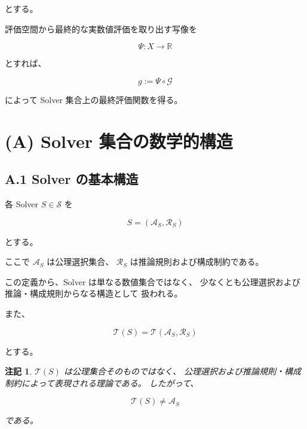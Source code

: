 \documentclass[a4paper,11pt]{article}
\newtheorem{remark}[definition]{注記}
\newcommand{\Solver}{\mathcal{S}}
\newcommand{\Aset}{\mathcal{A}}
\newcommand{\Rset}{\mathcal{R}}
\newcommand{\R}{\mathbb{R}}
\newcommand{\Eval}{\mathcal{G}}
\newcommand{\EvalMap}{\Psi}
\begin{document}
とする。

評価空間から最終的な実数値評価を取り出す写像を

\begin{equation}
    \EvalMap:
    X\longrightarrow\R
\end{equation}

とすれば、

\begin{equation}
    g
    :=
    \EvalMap\circ\Eval
\end{equation}

によって Solver 集合上の最終評価関数を得る。


\section{(A) Solver 集合の数学的構造}

\subsection{A.1 Solver の基本構造}

各 Solver $S\in\Solver$ を

\begin{equation}
    S=(\Aset_S,\Rset_S)
\end{equation}

とする。

ここで $\Aset_S$ は公理選択集合、
$\Rset_S$ は推論規則および構成制約である。

この定義から、Solver は単なる数値集合ではなく、
少なくとも公理選択および推論・構成規則からなる構造として
扱われる。

また、

\begin{equation}
    \mathcal{T}(S)
    =
    \mathcal{T}(\Aset_S,\Rset_S)
\end{equation}

とする。

\begin{remark}
$\mathcal{T}(S)$ は公理集合そのものではなく、
公理選択および推論規則・構成制約によって表現される理論である。
したがって、

\[
    \mathcal{T}(S)\neq\Aset_S
\]

である。
\end{remark}

\end{document}
